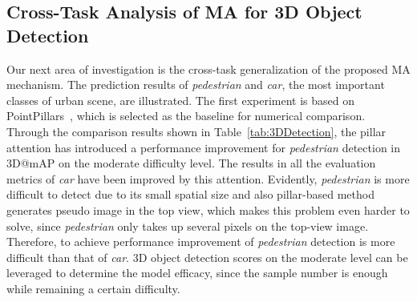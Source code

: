 \documentclass[lettersize,journal]{IEEEtran}
\begin{document}
\subsection{Cross-Task Analysis of MA for 3D Object Detection}
Our next area of investigation is the cross-task generalization of the proposed MA mechanism.
The prediction results of \emph{pedestrian} and \emph{car}, the most important classes of urban scene, are illustrated.
The first experiment is based on PointPillars~\cite{pointpillars}, which is selected as the baseline for numerical comparison. 
Through the comparison results shown in Table~\ref{tab:3DDetection}, the pillar attention has introduced a performance improvement for \emph{pedestrian} detection in 3D@mAP on the moderate difficulty level.
The results in all the evaluation metrics of \emph{car} have been improved by this attention.
Evidently, \emph{pedestrian} is more difficult to detect due to its small spatial size and also pillar-based method generates pseudo image in the top view, which makes this problem even harder to solve, since \emph{pedestrian} only takes up several pixels on the top-view image. Therefore, to achieve performance improvement of \emph{pedestrian} detection is more difficult than that of \emph{car}.
3D object detection scores on the moderate level can be leveraged to determine the model efficacy, since the sample number is enough while remaining a certain difficulty.
\end{document}
